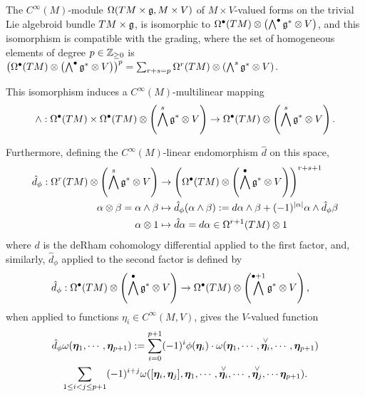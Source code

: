 \begin{theorem}\label{theoremTrivialFormsEValuedLValuedIsDifferentialModuleDefinitions}
The $C^\infty(M)$-module $\Omega(TM \times \mathfrak{g}, M \times V)$ of $M \times V$-valued forms on the trivial Lie algebroid bundle $TM \times \mathfrak{g}$, is isomorphic to $\Omega^\bullet(TM) \otimes \left(\bigwedge^\bullet \mathfrak{g}^* \otimes V\right)$, and this isomorphism is compatible with the grading, where the set of homogeneous elements of degree $p \in \mathbb{Z}_{\geq 0}$ is $\left( \Omega^\bullet(TM) \otimes \left(\bigwedge^\bullet \mathfrak{g}^* \otimes V\right) \right)^p = \sum_{r + s = p} \Omega^r(TM) \otimes \left(\bigwedge^s \mathfrak{g}^* \otimes V\right)$. 

This isomorphism induces a $C^\infty(M)$-multilinear mapping
\begin{equation}
    \wedge: \Omega^\bullet(TM) \times \Omega^\bullet(TM) \otimes \left(\bigwedge^s \mathfrak{g}^* \otimes V\right)
    \to 
    \Omega^\bullet(TM) \otimes \left(\bigwedge^s \mathfrak{g}^* \otimes V\right).
\end{equation}

Furthermore, defining the $C^\infty(M)$-linear endomorphism $\hat d$ on this space, 
\begin{align}
    \hat d_\phi: \Omega^r(TM) \otimes \left(\bigwedge^s \alg g^* \otimes V\right) &\to \left( \Omega^\bullet(TM) \otimes \left(\bigwedge^\bullet \alg g^* \otimes V\right)\right)^{r+s+1} \\
    \alpha \otimes \beta = \alpha \wedge \beta &\mapsto  \hat d_\phi (\alpha \wedge \beta) := d\alpha \wedge \beta + (-1)^{|\alpha|} \alpha \wedge \hat d_{\phi} \beta \\
    \alpha \otimes 1 &\mapsto \hat d\alpha = d\alpha \in \Omega^{r+1}(TM) \otimes 1 
\end{align}
where $d$ is the deRham cohomology differential applied to the first factor, and, similarly, $\hat d_\phi$ applied to the second factor is defined by
\begin{align*}
    \hat d_\phi: \Omega^\bullet(TM) \otimes \left(\bigwedge^\bullet \alg g^* \otimes V\right) &\to \Omega^\bullet(TM) \otimes \left(\bigwedge^{\bullet+1} \alg g^* \otimes V\right),
\end{align*} when applied to functions $\eta_i \in C^\infty(M, V)$, gives the $V$-valued function
\begin{multline}
    \hat d_\phi\omega(\sect \eta_1, \cdots, \sect \eta_{p+1}) := \sum_{i = 0}^{p+1} (-1)^i \phi(\sect \eta_i) \cdot \omega(\sect \eta_1, \cdots, \overset{\vee}{\sect \eta_i}, \cdots, \sect \eta_{p+1}) \\
    \sum_{1 \leq i < j \leq p+1} (-1)^{i+j} \omega([\sect \eta_i, \sect \eta_j], \sect \eta_1, \cdots, \overset{\vee}{\sect \eta_i}, \cdots, \overset{\vee}{\sect \eta_j}, \cdots \sect \eta_{p+1}).
\end{multline}


\end{theorem}
